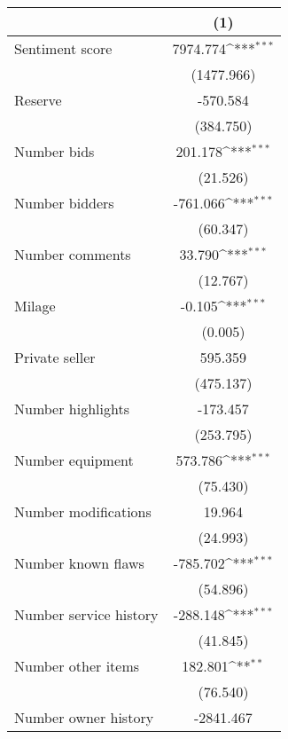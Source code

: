 {
\def\sym#1{\ifmmode^{#1}\else\(^{#1}\)\fi}
\begin{tabular}{l*{1}{c}}
\hline\hline
                    &\multicolumn{1}{c}{(1)}         \\
\hline
Sentiment score     &    7974.774\sym{***}\\
                    &  (1477.966)         \\
[1em]
Reserve             &    -570.584         \\
                    &   (384.750)         \\
[1em]
Number bids         &     201.178\sym{***}\\
                    &    (21.526)         \\
[1em]
Number bidders      &    -761.066\sym{***}\\
                    &    (60.347)         \\
[1em]
Number comments     &      33.790\sym{***}\\
                    &    (12.767)         \\
[1em]
Milage              &      -0.105\sym{***}\\
                    &     (0.005)         \\
[1em]
Private seller      &     595.359         \\
                    &   (475.137)         \\
[1em]
Number highlights   &    -173.457         \\
                    &   (253.795)         \\
[1em]
Number equipment    &     573.786\sym{***}\\
                    &    (75.430)         \\
[1em]
Number modifications&      19.964         \\
                    &    (24.993)         \\
[1em]
Number known flaws  &    -785.702\sym{***}\\
                    &    (54.896)         \\
[1em]
Number service history&    -288.148\sym{***}\\
                    &    (41.845)         \\
[1em]
Number other items  &     182.801\sym{**} \\
                    &    (76.540)         \\
[1em]
Number owner history&   -2841.467         \\

\end{tabular}}
